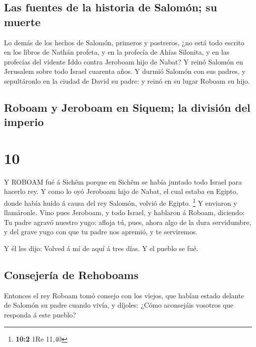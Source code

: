 \hypertarget{las-fuentes-de-la-historia-de-salomuxf3n-su-muerte}{%
\subsection{Las fuentes de la historia de Salomón; su
muerte}\label{las-fuentes-de-la-historia-de-salomuxf3n-su-muerte}}

 Lo demás de los hechos de Salomón, primeros y postreros,
¿no está todo escrito en los libros de Nathán profeta, y en la profecía
de Ahías Silonita, y en las profecías del vidente Iddo contra Jeroboam
hijo de Nabat?  Y reinó Salomón en Jerusalem sobre todo
Israel cuarenta años.  Y durmió Salomón con sus padres, y
sepultáronlo en la ciudad de David su padre: y reinó en su lugar Roboam
su hijo.

\hypertarget{roboam-y-jeroboam-en-siquem-la-divisiuxf3n-del-imperio}{%
\subsection{Roboam y Jeroboam en Siquem; la división del
imperio}\label{roboam-y-jeroboam-en-siquem-la-divisiuxf3n-del-imperio}}

\hypertarget{section-9}{%
\section{10}\label{section-9}}

 Y ROBOAM fué á Sichêm porque en Sichêm se había juntado
todo Israel para hacerlo rey.  Y como lo oyó Jeroboam hijo
de Nabat, el cual estaba en Egipto, donde había huído á causa del rey
Salomón, volvió de Egipto. \footnote{\textbf{10:2} 1Re 11,40}
 Y enviaron y llamáronle. Vino pues Jeroboam, y todo Israel,
y hablaron á Roboam, diciendo:  Tu padre agravó nuestro
yugo: afloja tú, pues, ahora algo de la dura servidumbre, y del grave
yugo con que tu padre nos apremió, y te serviremos.

 Y él les dijo: Volved á mí de aquí á tres días. Y el pueblo
se fué.

\hypertarget{consejeruxeda-de-rehoboams}{%
\subsection{Consejería de Rehoboams}\label{consejeruxeda-de-rehoboams}}

 Entonces el rey Roboam tomó consejo con los viejos, que
habían estado delante de Salomón su padre cuando vivía, y díjoles: ¿Cómo
aconsejáis vosotros que responda á este pueblo?

